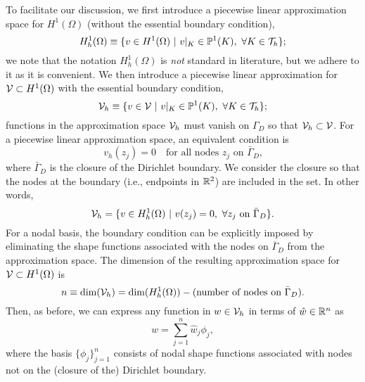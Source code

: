 To facilitate our discussion, we first introduce a piecewise linear approximation space for $H^1(\Omega)$ (without the essential boundary condition),
\begin{equation*}
  H^1_h(\Omega) \equiv \{ v \in H^1(\Omega) \ | \ v|_K \in \PP^1(K), \ \forall K \in \calT_h \};
\end{equation*}
we note that the notation $H^1_h(\Omega)$ is \emph{not} standard in literature, but we adhere to it as it is convenient. We then introduce a piecewise linear approximation for $\mathcal{V} \subset H^1(\Omega)$ with the essential boundary condition,
\begin{equation*}
  \mathcal{V}_h \equiv \{ v \in \mathcal{V} \ | \ v|_K \in \mathbb{P}^1(K), \ \forall K \in \mathcal{T}_h \};
\end{equation*}
functions in the approximation space $\mathcal{V}_h$ must vanish on $\Gamma_D$ so that $\mathcal{V}_h \subset \mathcal{V}$.  For a piecewise linear approximation space, an equivalent condition is
\begin{equation*}
  v_h(z_j) = 0 \quad \text{for all nodes $z_j$ on $\bar \Gamma_D$,}
\end{equation*}
where $\bar \Gamma_D$ is the closure of the Dirichlet boundary.  We consider the closure so that the nodes at the boundary (i.e., endpoints in $\mathbb{R}^2$) are included in the set. In other words,
\begin{equation*}
  \mathcal{V}_h = \{ v \in H^1_h(\Omega) \ | \ v(z_j) = 0, \ \forall z_j \text{ on } \bar \Gamma_D \}.
\end{equation*}
For a nodal basis, the boundary condition can be explicitly imposed by eliminating the shape functions associated with the nodes on $\overline \Gamma_D$ from the approximation space. The dimension of the resulting approximation space for $\mathcal{V} \subset H^1(\Omega)$ is
\begin{equation*}
  n \equiv \text{dim}(\mathcal{V}_h) = \text{dim}(H^1_h(\Omega)) - (\text{number of nodes on $\bar \Gamma_D$}).
\end{equation*}
Then, as before, we can express any function in $w \in \mathcal{V}_h$ in terms of $\hat w \in \mathbb{R}^n$ as
\begin{equation*}
  w = \sum_{j=1}^n \hat w_j \phi_j,
\end{equation*}
where the basis $\{ \phi_j \}_{j=1}^n$ consists of nodal shape functions associated with nodes not on the (closure of the) Dirichlet boundary.

